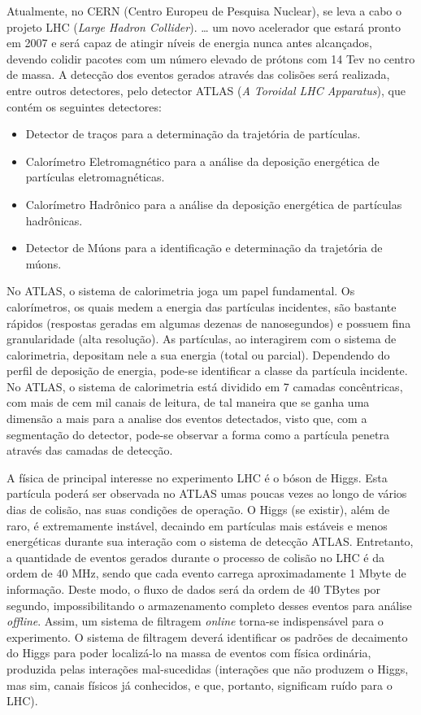 Atualmente, no CERN (Centro Europeu de Pesquisa Nuclear), se leva a cabo o projeto LHC (\emph{Large Hadron Collider}). … um novo acelerador que estará pronto em 2007 e será capaz de atingir níveis de energia nunca antes alcançados, devendo colidir pacotes com um número elevado de prótons com 14 Tev no centro de massa. A detecção dos eventos gerados através das colisões será realizada, entre outros detectores, pelo detector ATLAS (\emph{A Toroidal LHC Apparatus}), que contém os seguintes detectores:
 
\begin{itemize}

\item Detector de traços para a determinação da trajetória de partículas.
\item Calorímetro Eletromagnético para a análise da deposição energética de partículas eletromagnéticas.
\item Calorímetro Hadrônico para a análise da deposição energética de partículas hadrônicas.
\item Detector de Múons para a identificação e determinação da trajetória de múons.

\end{itemize}
 
No ATLAS, o sistema de calorimetria joga um papel fundamental. Os calorímetros, os quais medem a energia das partículas incidentes, são bastante rápidos (respostas geradas em algumas dezenas de nanosegundos) e possuem fina granularidade (alta resolução). As partículas, ao interagirem com o sistema de calorimetria, depositam nele a sua energia (total ou parcial). Dependendo do perfil de deposição de energia, pode-se identificar a classe da partícula incidente. No ATLAS, o sistema de calorimetria está dividido em 7 camadas concêntricas, com mais de cem mil canais de leitura, de tal maneira que se ganha uma dimensão a mais para a analise dos eventos detectados, visto que, com a segmentação do detector, pode-se observar a forma como a partícula penetra através das camadas de detecção.

A física de principal interesse no experimento LHC é o bóson de Higgs. Esta partícula poderá ser observada no ATLAS umas poucas vezes ao longo de vários dias de colisão, nas suas condições de operação. O Higgs (se existir), além de raro, é extremamente instável, decaindo em partículas mais estáveis e menos energéticas durante sua interação com o sistema de detecção ATLAS. Entretanto, a quantidade de eventos gerados durante o processo de colisão no LHC é da ordem de 40 MHz, sendo que cada evento carrega aproximadamente 1 Mbyte de informação. Deste modo, o fluxo de dados será da ordem de 40 TBytes por segundo, impossibilitando o armazenamento completo desses eventos para análise \emph{offline}. Assim, um sistema de filtragem \emph{online} torna-se indispensável para o experimento. O sistema de filtragem deverá identificar os padrões de decaimento do Higgs para poder localizá-lo na massa de eventos com física ordinária, produzida pelas interações mal-sucedidas (interações que não produzem o Higgs, mas sim, canais físicos já conhecidos, e que, portanto, significam ruído para o LHC).

